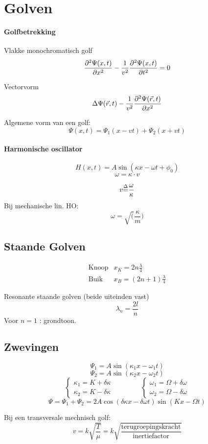 \newpage
\section{Golven}
\label{sec:Golven}

\paragraph{Golfbetrekking}

Vlakke monochromatisch golf
\[
  \frac{\partial ^2{\Psi(x,t)}}{\partial x^2} - \frac{1}{v^2}\frac{\partial ^2{\Psi(x,t)}}{\partial t^2} = 0
\]

Vectorvorm
\[
  \Delta \Psi(\vec{r},t) - \frac{1}{v^2} \frac{\partial ^2{\Psi(\vec{r},t)}}{\partial x^2}
\]

Algemene vorm van een golf:
\[
  \Psi(x,t) = \Psi_1(x-vt) + \Psi_2(x+vt)
\]


\paragraph{Harmonische oscillator}
\[
  H(x,t) = A \sin(\kappa x- \omega t + \phi_0)
\]
\[
  \omega = \kappa \cdot v
\]



\[
  v \mbox{$\stackrel{\Delta}{=}$} \frac{\omega}{\kappa}
\]
Bij mechanische lin. HO:
\[
  \omega = \sqrt(\frac{\kappa}{m})
\]

\subsection{Staande Golven}
\[
  \begin{array}{ll}
    \mbox{Knoop} & x_K =  2n     \frac{\lambda}{4} \\
    \mbox{Buik } & x_B = (2n +1) \frac{\lambda}{4} 
  \end{array}
\]

Resonante staande golven (beide uiteinden vast)
\[
  \lambda_n = \frac{2 l}{n}
\]
Voor $n=1$ : grondtoon.

\subsection{Zwevingen}
\[
  \Psi_1 = A \sin(\kappa_1 x - \omega_1 t)
\]
\[
  \Psi_2 = A \sin(\kappa_2 x - \omega_2 t)
\]
\[
  \left\{
    \begin{array}{l}
      \kappa_1 = K + \delta\kappa \\
      \kappa_2 = K - \delta\kappa
    \end{array}
  \right.
  \qquad \qquad
  \left\{
    \begin{array}{l}
      \omega_1 = \Omega + \delta\omega \\
      \omega_2 = \Omega - \delta\omega
    \end{array}
  \right.
\]
\[
  \Psi = \Psi_1 + \Psi_2 = 2 A \cos \left( \delta \kappa x - \delta \omega t \right) 
                               \sin \left( K x - \Omega t \right)
\]

Bij een transversale mechnisch golf:
\[
  v = k \sqrt{\frac{T}{\mu}} = k \sqrt{\frac{\mbox{terugroepingskracht}}{\mbox{inertiefactor}}}
\]

